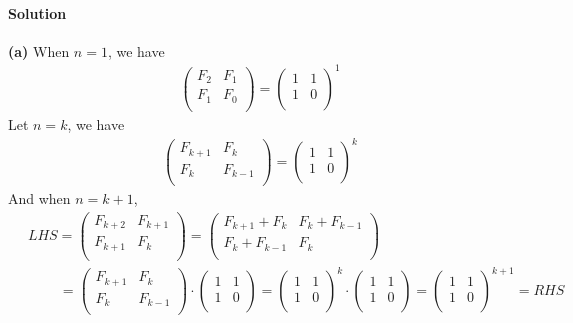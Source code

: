 \documentclass[a4paper]{scrartcl}
\begin{document}
\paragraph{Solution}
{\bfseries(a)} When $n=1$, we have \\
\begin{align*}
  \begin{pmatrix}
   F_{2} & F_1 \\
   F_1 & F_0 \\
  \end{pmatrix}
  =
  \begin{pmatrix}
    1 & 1 \\
    1 & 0 \\
  \end{pmatrix}^{\!1}
\end{align*}
Let $n=k$, we have\\
\begin{align*}
  \begin{pmatrix}
   F_{k+1} & F_k \\
   F_k & F_{k-1} \\
  \end{pmatrix}
  =
  \begin{pmatrix}
    1 & 1 \\
    1 & 0 \\
  \end{pmatrix}^{\!k}
\end{align*}
And when $n=k+1$,
\begin{align*}
  &\ LHS=
  \begin{pmatrix}
   F_{k+2} & F_{k+1} \\
   F_{k+1} & F_{k} \\
  \end{pmatrix} = 
  \begin{pmatrix}
    F_{k+1} + F_{k} & F_k + F_{k-1}\\
    F_k + F_{k-1} & F_k \\
  \end{pmatrix} \\ &\
  \qquad\ = \begin{pmatrix}
    F_{k+1} & F_k\\
    F_k  & F_{k-1} \\
  \end{pmatrix} 
  \cdot
  \begin{pmatrix}
    1 & 1 \\
    1 & 0 \\
  \end{pmatrix} =
  \begin{pmatrix}
    1 & 1 \\
    1 & 0 \\
  \end{pmatrix}^{\!k}
  \cdot
  \begin{pmatrix}
    1 & 1 \\
    1 & 0 \\
  \end{pmatrix} =
  \begin{pmatrix}
    1 & 1 \\
    1 & 0 \\
  \end{pmatrix}^{\!k+1} = RHS
\end{align*}
\end{document}
